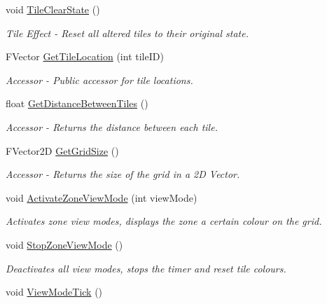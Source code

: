 \begin{DoxyCompactItemize}
void \mbox{\hyperlink{class_a_t_t___grid_manager_a5bcea6c5c60adcfb537a996c0eede4a5}{Tile\+Clear\+State}} ()
\begin{DoxyCompactList}\small\item\em Tile Effect -\/ Reset all altered tiles to their original state. \end{DoxyCompactList}\item 
F\+Vector \mbox{\hyperlink{class_a_t_t___grid_manager_a8498f5d3bf51947e60b9604cc8a6ae37}{Get\+Tile\+Location}} (int tile\+ID)
\begin{DoxyCompactList}\small\item\em Accessor -\/ Public accessor for tile locations. \end{DoxyCompactList}\item 
float \mbox{\hyperlink{class_a_t_t___grid_manager_ac48caa79e0a7d2255484da80e5e563d3}{Get\+Distance\+Between\+Tiles}} ()
\begin{DoxyCompactList}\small\item\em Accessor -\/ Returns the distance between each tile. \end{DoxyCompactList}\item 
F\+Vector2D \mbox{\hyperlink{class_a_t_t___grid_manager_ac32858e31de063415fcb5131962d4a59}{Get\+Grid\+Size}} ()
\begin{DoxyCompactList}\small\item\em Accessor -\/ Returns the size of the grid in a 2D Vector. \end{DoxyCompactList}\item 
void \mbox{\hyperlink{class_a_t_t___grid_manager_a209c380bfc8c559954b0898bef309038}{Activate\+Zone\+View\+Mode}} (int view\+Mode)
\begin{DoxyCompactList}\small\item\em Activates zone view modes, displays the zone a certain colour on the grid. \end{DoxyCompactList}\item 
\mbox{\label{class_a_t_t___grid_manager_a508f83eb4ba58bdb100f000003be810b}} 
void \mbox{\hyperlink{class_a_t_t___grid_manager_a508f83eb4ba58bdb100f000003be810b}{Stop\+Zone\+View\+Mode}} ()
\begin{DoxyCompactList}\small\item\em Deactivates all view modes, stops the timer and reset tile colours. \end{DoxyCompactList}\item 
void \mbox{\hyperlink{class_a_t_t___grid_manager_af9a2760978252820113e0c370b62f234}{View\+Mode\+Tick}} ()

\end{DoxyCompactItemize}
